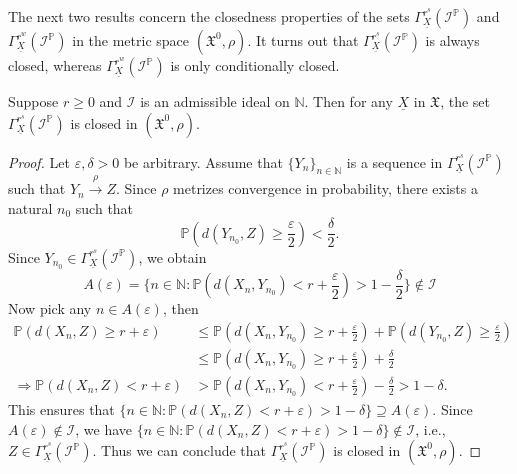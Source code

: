 \documentclass[reqno]{amsart}
\begin{document}
The next two results concern the closedness properties of the sets $\Gamma^{r^s}_{\underline{X}}(\mathcal{I}^{\mathbb{P}})$ and $\Gamma^{r^w}_{\underline{X}}(\mathcal{I}^{\mathbb{P}})$ in the metric space $(\mathfrak{X^0},\rho)$. It turns out that $\Gamma^{r^s}_{\underline{X}}(\mathcal{I}^{\mathbb{P}})$ is always closed,  whereas $\Gamma^{r^w}_{\underline{X}}(\mathcal{I}^{\mathbb{P}})$ is only conditionally closed.

\begin{proposition}\label{strong closed}
	Suppose $r\geq 0$ and $\mathcal{I}$ is an admissible ideal on $\mathbb{N}$. Then for any $\underline{X}$ in $\mathfrak{X}$, the set  $\Gamma^{r^s}_{\underline{X}}(\mathcal{I}^{\mathbb{P}})$ is closed in $(\mathfrak{X^0},\rho)$. 
\end{proposition}
\begin{proof}
	
Let $\varepsilon,\delta>0$ be arbitrary.
Assume that $\{Y_n\}_{n\in\mathbb{N}}$ is a sequence in $\Gamma^{r^s}_{\underline{X}}(\mathcal{I}^{\mathbb{P}})$ such that $Y_n\xrightarrow{\rho} Z$.  Since $\rho$ metrizes convergence in probability, there exists a natural $n_0$ such that
$$
\mathbb{P}(d(Y_{n_0},Z)\geq\frac{\varepsilon}{2})<\frac{\delta}{2}.
$$
Since $Y_{n_0}\in\Gamma^{r^s}_{\underline{X}}(\mathcal{I}^{\mathbb{P}})$, we obtain
$$
A(\varepsilon)=\{n\in\mathbb{N}:\mathbb{P}(d(X_n,Y_{n_0})<r+\frac{\varepsilon}{2})>1-\frac{\delta}{2}\}\notin\mathcal{I}
$$
Now pick any $n\in A(\varepsilon)$, then
\begin{align*}
	\mathbb{P}(d(X_n,Z)\geq r+\varepsilon)&\leq  \mathbb{P}(d(X_n,Y_{n_0})\geq r+\frac{\varepsilon}{2})+	\mathbb{P}(d(Y_{n_0},Z)\geq\frac{\varepsilon}{2})\\
	&\leq \mathbb{P}(d(X_n,Y_{n_0})\geq r+\frac{\varepsilon}{2})+\frac{\delta}{2}\\
	\Rightarrow 	\mathbb{P}(d(X_n,Z)<r+\varepsilon)&>\mathbb{P}(d(X_n,Y_{n_0})<r+\frac{\varepsilon}{2})-\frac{\delta}{2}>1-\delta.
\end{align*}
This ensures that  $\{n\in\mathbb{N}:\mathbb{P}(d(X_n,Z)<r+\varepsilon)>1-\delta\}\supseteq A(\varepsilon)$. Since $A(\varepsilon)\notin\mathcal{I}$, we have $\{n\in\mathbb{N}:\mathbb{P}(d(X_n,Z)<r+\varepsilon)>1-\delta\}\notin\mathcal{I}$, i.e., $Z\in\Gamma^{r^s}_{\underline{X}}(\mathcal{I}^{\mathbb{P}})$. Thus we can conclude that $\Gamma^{r^s}_{\underline{X}}(\mathcal{I}^{\mathbb{P}})$ is closed in $(\mathfrak{X^0},\rho)$. 
\end{proof}
\end{document}
